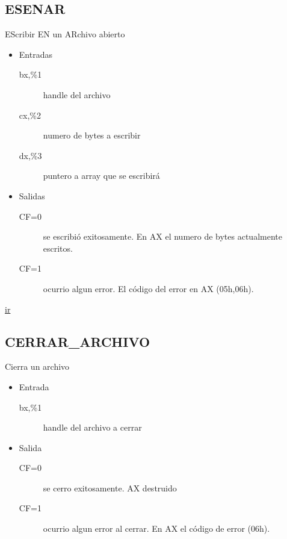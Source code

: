 \subsection{ESENAR}
\label{sec-1-6}
EScribir EN un ARchivo abierto
\begin{itemize}
\item Entradas
\begin{description}
\item[bx,\%1] handle del archivo
\item[cx,\%2] numero de bytes a escribir
\item[dx,\%3] puntero a array que se escribirá
\end{description}
\item Salidas
\begin{description}
\item[CF=0] se escribió exitosamente. En AX el numero de
bytes actualmente escritos.
\item[CF=1] ocurrio algun error. El código del error en AX
(05h,06h).
\end{description}
\end{itemize}
\href{http://www.ctyme.com/intr/rb-2791.htm}{ir}


\subsection{CERRAR\_ARCHIVO}
\label{sec-1-7}
Cierra un archivo
\begin{itemize}
\item Entrada
\begin{description}
\item[bx,\%1] handle del archivo a cerrar
\end{description}
\item Salida
\begin{description}
\item[CF=0] se cerro exitosamente. AX destruido
\item[CF=1] ocurrio algun error al cerrar. En AX el código
de error (06h).
\end{description}
\end{itemize}

